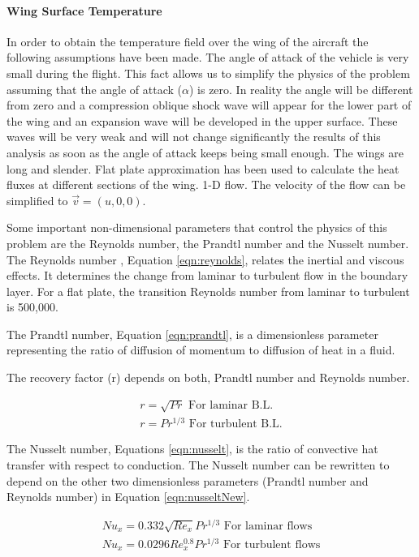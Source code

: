 \paragraph{Wing Surface Temperature}
In order to obtain the temperature field over the wing of the aircraft the following assumptions have been made.
	The angle of attack of the vehicle is very small during the flight. This fact allows us to simplify the physics of the problem assuming that the angle of attack ($\alpha$) is zero. In reality the angle will be different from zero and a compression oblique shock wave will appear for the lower part of the wing and an expansion wave will be developed in the upper surface. These waves will be very weak and will not change significantly the results of this analysis as soon as the angle of attack keeps being small enough.
	The wings are long and slender. Flat plate approximation has been used to calculate the heat fluxes at different sections of the wing.
	1-D flow. The velocity of the flow can be simplified to $\overrightarrow{v}=(u,0,0)$.
	
Some important non-dimensional parameters that control the physics of this problem are the Reynolds number, the Prandtl number and the Nusselt number.
The Reynolds number , Equation \ref{eqn:reynolds}, relates the inertial and viscous effects. It determines the change from laminar to turbulent flow in the boundary layer. For a flat plate, the transition Reynolds number from laminar to turbulent is 500,000.

The Prandtl number, Equation \ref{eqn:prandtl}, is a dimensionless parameter representing the ratio of diffusion of momentum to diffusion of heat in a fluid.

The recovery factor (r) depends on both, Prandtl number and Reynolds number.

\begin{equation}
\begin{split}
r=\sqrt{Pr} \text{  For laminar B.L.}	\\
r=Pr^{1/3} \text{  For turbulent B.L.}
\end{split}
\end{equation}

The Nusselt number, Equations \ref{eqn:nusselt}, is the ratio of convective hat transfer with respect to conduction. The Nusselt number can be rewritten to depend on the other two dimensionless parameters (Prandtl number and Reynolds number) in Equation \ref{eqn:nusseltNew}.

\begin{equation}
\begin{split}
Nu_x=0.332\sqrt{Re_x} Pr^{1/3}	\text{  For laminar flows} \\
Nu_x=0.0296Re_x^{0.8} Pr^{1/3}	\text{  For turbulent flows}
\end{split}
\label{eqn:nusseltNew}
\end{equation}

